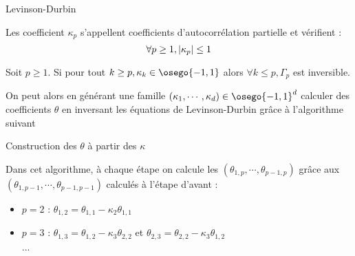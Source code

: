\documentclass{report}
\begin{document}
\begin{algorithm}[H]
 \caption{Levinson-Durbin}
 \label{algo:levinson}
\end{algorithm}
\begin{Prop}
Les coefficient $\kappa_p$ s'appellent coefficients d'autocorrélation partielle et vérifient :
$$
\forall p\geq 1, { \left| \kappa_p \right|} \leq 1
$$
\end{Prop}
\begin{Prop}\label{prop:Gamma_inv}
Soit $p\geq 1$. Si pour tout $k \geq p, \kappa_k \in \osego{-1,1}$ alors $\forall k\leq p, \Gamma_p$ est inversible.
\end{Prop}
On peut alors en générant une famille $(\kappa_1, \cdots , \kappa_d) \in \osego{-1,1}^d$ calculer des coefficients $\theta$ en inversant les équations de Levinson-Durbin grâce à l'algorithme suivant \\
\begin{algorithm}[H]
 \caption{Construction des $\theta$ à partir  des $\kappa$}
 \label{algo:construction}
\end{algorithm}
\begin{Rque}
Dans cet algorithme, à chaque étape on calcule les $(\theta_{1,p}, \cdots, \theta_{p-1,p})$ grâce aux $(\theta_{1,p-1}, \cdots, \theta_{p-1,p-1})$ calculés à l'étape d'avant :
\begin{itemize}
\item $p=2$ : $\theta_{1,2} = \theta_{1,1} - \kappa_2 \theta_{1,1}$
\item $p=3$ : $\theta_{1,3} = \theta_{1,2} - \kappa_3 \theta_{2,2}$ et $\theta_{2,3} = \theta_{2,2} - \kappa_3 \theta_{1,2}$\\
...
\end{itemize} 
\end{Rque}
\end{document}
